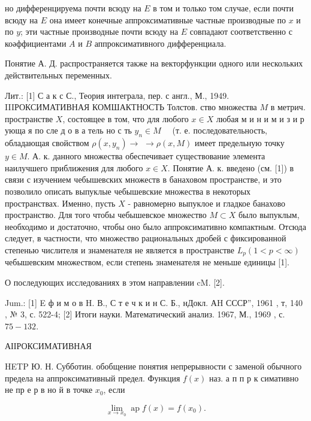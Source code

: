 \documentclass[10pt]{article}
\begin{document}
но дифференцируема почти всюду на $E$ в том и только том случае, если почти всюду на $E$ она имеет конечные аппроксимативные частные производные по $x$ и по $y$; эти частные производные почти всюду на $E$ совпадают соответственно с коәффициентами $A$ и $B$ аппроксимативного дифференциала.



Понятие А. Д. распространяется также на векторфункции одного или нескольких действительных переменных.



Лит.: [1] С а к с С., Теория интеграла, пер. с англ., М., 1949. IIIРОКСИМАТИВНАЯ КОМШАКТНОСТЬ Толстов. ство множества $M$ в метрич. пространстве $X$, состоящее в том, что для любого $x \in X$ любая м и н и м и з и р ующа я по сле д о в а тель но с ть $y_{n} \in M \quad$ (т. е. последовательность, обладающая свойством $\rho\left(x, y_{n}\right) \rightarrow$ $\rightarrow \rho(x, M)$ имеет предельную точку $y \in M$. А. к. данного множества обеспечивает существование элемента наилучшего приближения для любого $x \in X$. Понятие А. к. введено (см. [1]) в связи с изучением чебышевских множеств в банаховом пространстве, и это позволило описать выпуклые чебышевские множества в некоторых пространствах. Именно, пусть $X$ - равномерно выпуклое и гладкое банахово пространство. Для того чтобы чебышевское множество $M \subset X$ было выпуклым, необходимо и достаточно, чтобы оно было аппроксимативно компактным. Отсюда следует, в частности, что множество рациональных дробей с фиксированной степенью числителя и знаменателя не является в пространстве $L_{p}(1<p<\infty)$ чебышевским множеством, если степень знаменателя не меньше единицы [1].



О последующих исследованиях в этом направлении cM. [2].



Jum.: [1] E ф и м о в H. В., С т е ч к и н С. Б., нДокл. АH СССР”, 1961 , т, 140 , № 3, с. 522-4; [2] Итоги науки. Математический анализ. 1967, М., 1969 , с. $75-132$.



АІІРОКСИМАТИВНАЯ



HETP Ю. Н. Субботин. обобщение понятия непрерывности с заменой обычного предела на аппроксимативный предел. Функция $f(x)$ наз. а п п р к симативно не пр е р в но й в точке $x_{0}$, если



\[

\lim _{x \rightarrow x_{0}} \operatorname{ap} f(x)=f\left(x_{0}\right) .

\]
\end{document}
